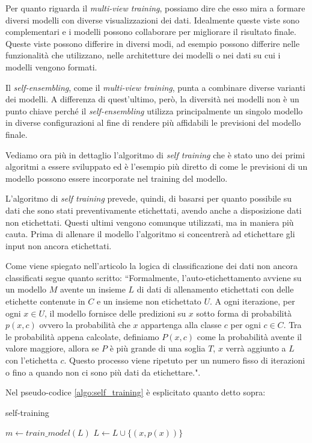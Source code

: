 \documentclass[12pt,italian]{report}
\begin{document}
Per quanto riguarda il \emph{multi-view training}, possiamo dire che esso mira a formare diversi modelli con diverse visualizzazioni dei dati. Idealmente queste viste sono complementari e i modelli possono collaborare per migliorare il risultato finale. Queste viste possono differire in diversi modi, ad esempio possono differire nelle funzionalità che utilizzano, nelle architetture dei modelli o nei dati su cui i modelli vengono formati.

Il \emph{self-ensembling}, come il \emph{multi-view training}, punta a combinare diverse varianti dei modelli. A differenza di quest'ultimo, però, la diversità nei modelli non è un punto chiave perché il \emph{self-ensembling} utilizza principalmente un singolo modello in diverse configurazioni al fine di rendere più affidabili le previsioni del modello finale. 

Vediamo ora più in dettaglio l'algoritmo di \emph{self training} che è stato uno dei primi algoritmi a essere sviluppato ed è l'esempio più diretto di come le previsioni di un modello possono essere incorporate nel training del modello.

L'algoritmo di \emph{self training} prevede, quindi, di basarsi per quanto possibile su dati che sono stati preventivamente etichettati, avendo anche a disposizione dati non etichettati. Questi ultimi vengono comunque utilizzati, ma in maniera più cauta. Prima di allenare il modello l'algoritmo si concentrerà ad etichettare gli input non ancora etichettati.

Come viene spiegato nell'articolo \cite{ruder} %
la logica di classificazione dei dati non ancora classificati segue quanto scritto: ``Formalmente, l'auto-etichettamento avviene su un modello $ M $ avente un insieme $ L $ di dati di allenamento etichettati con delle etichette contenute in $ C $ e un insieme non etichettato $ U $. A ogni iterazione, per ogni $x \in U$, il modello fornisce delle predizioni su $ x $ sotto forma di probabilità $ p(x, c) $ ovvero la probabilità che $ x $ appartenga alla classe $ c $ per ogni $ c \in C $. Tra le probabilità appena calcolate, definiamo $ P(x, c) $ come la probabilità avente il valore maggiore, allora se $ P $ è più grande di una soglia $ T $, $ x $ verrà aggiunto a $ L $ con l'etichetta $ c $. Questo processo viene ripetuto per un numero fisso di iterazioni o fino a quando non ci sono più dati da etichettare.". \cite{ruder} %

Nel pseudo-codice \ref{algo:self_training} è esplicitato quanto detto sopra:
\begin{algorithm}
	\caption{self-training}\label{algo:self_training}
	\begin{algorithmic}[1]
		\Repeat
		\State $m \gets train\_model(L)$
		\State $L \gets L \cup \{(x, p(x))\}$
		\EndIf
		\EndFor
	\end{algorithmic}
\end{algorithm}
\end{document}
